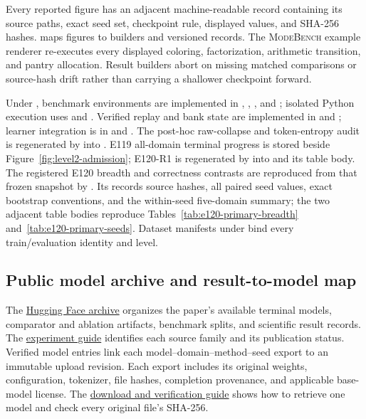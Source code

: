 \documentclass{article}
\newcommand{\1}{\mathbf 1}
\newcommand{\mb}{\textsc{ModeBench}}
\theoremstyle{remark}
\theoremstyle{definition}
\theoremstyle{plain}
\begin{document}
Every reported figure has an adjacent machine-readable record containing its
source paths, exact seed set, checkpoint rule, displayed values, and SHA-256
hashes.  maps figures to builders and versioned
records. The \mb{} example renderer re-executes every displayed coloring,
factorization, arithmetic transition, and pantry allocation. Result builders
abort on missing matched comparisons or source-hash drift rather than carrying a
shallower checkpoint forward.

Under , benchmark environments are implemented in
, , , and
; isolated Python execution uses
 and .
Verified replay and bank state are implemented in
 and ; learner
integration is in  and . The
post-hoc raw-collapse and token-entropy audit is regenerated by
 into
. E119 all-domain
terminal progress is stored beside Figure~\ref{fig:level2-admission}; E120-R1 is
regenerated by 
into  and its table body.
The registered E120 breadth and correctness contrasts are reproduced from
that frozen snapshot by
. Its
 records source hashes, all
paired seed values, exact bootstrap conventions, and the within-seed
five-domain summary; the two adjacent table bodies reproduce
Tables~\ref{tab:e120-primary-breadth} and~\ref{tab:e120-primary-seeds}.
Dataset manifests under  bind every train/evaluation identity
and level.


\subsection{Public model archive and result-to-model map}
\label{app:archived-models}

The \href{https://huggingface.co/od2961/maxent-grpo-models}{Hugging Face archive}
organizes the paper's available terminal models, comparator and ablation
artifacts, benchmark splits, and scientific result records. The
\href{https://huggingface.co/od2961/maxent-grpo-models/blob/main/EXPERIMENTS.md}{experiment guide}
identifies each source family and its publication status. Verified model entries
link each model--domain--method--seed export to an immutable upload revision. Each export includes its original weights,
configuration, tokenizer, file hashes, completion provenance, and applicable
base-model license. The \href{https://huggingface.co/od2961/maxent-grpo-models/blob/main/RESTORE.md}{download and verification guide}
shows how to retrieve one model and check every original file's SHA-256.
\end{document}
